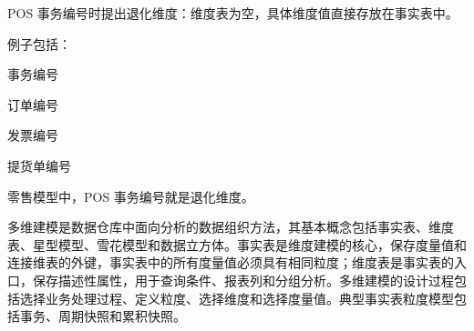\documentclass[UTF8,zihao=-4]{ctexart}
\begin{document}
\hspace*{1em}POS 事务编号时提出退化维度：维度表为空，具体维度值直接存放在事实表中。\par

例子包括：\par

事务编号\par
订单编号\par
发票编号\par
提货单编号\par

零售模型中，POS 事务编号就是退化维度。\par

多维建模是数据仓库中面向分析的数据组织方法，其基本概念包括事实表、维度表、星型模型、雪花模型和数据立方体。事实表是维度建模的核心，保存度量值和连接维表的外键，事实表中的所有度量值必须具有相同粒度；维度表是事实表的入口，保存描述性属性，用于查询条件、报表列和分组分析。多维建模的设计过程包括选择业务处理过程、定义粒度、选择维度和选择度量值。典型事实表粒度模型包括事务、周期快照和累积快照。\par
\end{document}
